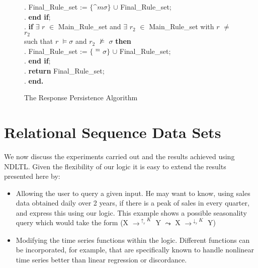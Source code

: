 {\begin{figure}[ht]
\begin{center}
{\begin{minipage}{16cm}
\begin{algorithm}
\begin{rm}
\begin{tabbing}
\sa.  \> \> \> \> Final\_Rule\_set := $\{ \bm^m \sigma  \}$ $\cup$ Final\_Rule\_set; \\
\sa.  \> \> \> {\bf end if};\\
\sa.  \> \> \> {\bf if } $\exists$ $r$ $\in$ Main\_Rule\_set and $\exists$ $r_2$
$\in$ Main\_Rule\_set with $r$ $\not=$ $r_2$ \\ 
\> \> \> \> \> such that $r$ $\models \sigma$ and $r_2$
 $\not\models$ $\sigma$ {\bf then} \\
\sa.  \> \> \> \> Final\_Rule\_set := $\{$ \diam$^m$ $\sigma \}$ $\cup$ Final\_Rule\_set;\\
\sa.  \> \> \> {\bf end if};\\

\sa.  \> \> \> {\bf return} Final\_Rule\_set; \\
\sa. \> \> {\bf end.}
\end{tabbing}
\end{rm}
\end{algorithm}
\end{minipage}}
\caption{\label{tr:fig:resp} The Response Persistence Algorithm}
\end{center}
\end{figure}
}




\section{Relational Sequence Data Sets}\label{sec:tr_relseq}

We now discuss the experiments carried out and the results achieved
using NDLTL. Given the flexibility of our logic it is easy to extend
the results presented here by: 
\begin{itemize}
\item Allowing the user to query a given input. He may want to know,
using sales data obtained daily over 2 years, if there is a peak of sales in every quarter, and
express this using our logic. This example shows a possible
seasonality query which would take the form \linebreak[4]  (X
$\to^{\uparrow_r K}$ Y $\leadsto$ X $\to^{\downarrow_r K}$ Y)
\item Modifying the time series functions within the logic. Different
functions can be incorporated, for example, that are specifically
known to handle nonlinear time series better than linear regression or
discordance.
\end{itemize}

